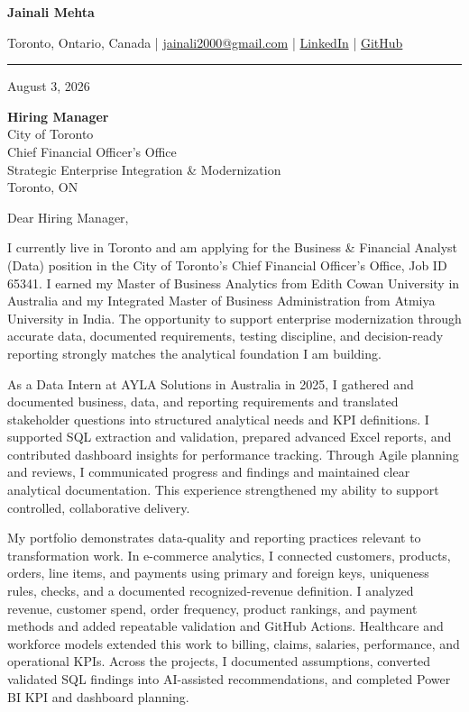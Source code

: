 \documentclass[letterpaper,10pt]{article}
\begin{document}
\begin{center}
  {\fontsize{17}{19}\selectfont\textbf{Jainali Mehta}}\par\vspace{2pt}
  \small Toronto, Ontario, Canada \;|\;
  \href{mailto:jainali2000@gmail.com}{jainali2000@gmail.com} \;|\;
  \href{https://www.linkedin.com/in/jainali-mehta}{LinkedIn} \;|\;
  \href{https://github.com/jainalimehta}{GitHub}
\end{center}
\vspace{-5pt}
\noindent\rule{\textwidth}{0.4pt}

August 3, 2026

\textbf{Hiring Manager}\\
City of Toronto\\
Chief Financial Officer's Office\\
Strategic Enterprise Integration \& Modernization\\
Toronto, ON

Dear Hiring Manager,

I currently live in Toronto and am applying for the Business \& Financial Analyst (Data) position in the City of Toronto's Chief Financial Officer's Office, Job ID 65341. I earned my Master of Business Analytics from Edith Cowan University in Australia and my Integrated Master of Business Administration from Atmiya University in India. The opportunity to support enterprise modernization through accurate data, documented requirements, testing discipline, and decision-ready reporting strongly matches the analytical foundation I am building.

As a Data Intern at AYLA Solutions in Australia in 2025, I gathered and documented business, data, and reporting requirements and translated stakeholder questions into structured analytical needs and KPI definitions. I supported SQL extraction and validation, prepared advanced Excel reports, and contributed dashboard insights for performance tracking. Through Agile planning and reviews, I communicated progress and findings and maintained clear analytical documentation. This experience strengthened my ability to support controlled, collaborative delivery.

My portfolio demonstrates data-quality and reporting practices relevant to transformation work. In e-commerce analytics, I connected customers, products, orders, line items, and payments using primary and foreign keys, uniqueness rules, checks, and a documented recognized-revenue definition. I analyzed revenue, customer spend, order frequency, product rankings, and payment methods and added repeatable validation and GitHub Actions. Healthcare and workforce models extended this work to billing, claims, salaries, performance, and operational KPIs. Across the projects, I documented assumptions, converted validated SQL findings into AI-assisted recommendations, and completed Power BI KPI and dashboard planning.
\end{document}
